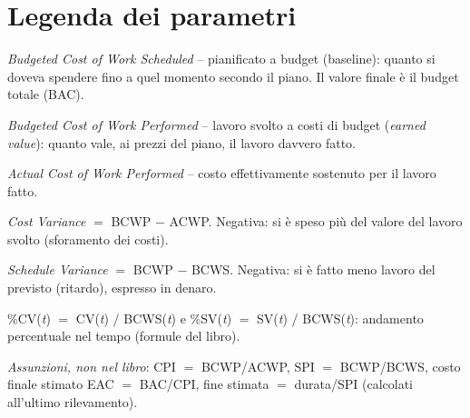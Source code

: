\documentclass[a4paper,10pt]{article}
\newcommand{\Durata}{12}
\begin{document}
\begin{center}
\end{center}
\CCprevisione{}{\CCmotivo}

\section*{\large Legenda dei parametri}
\begin{small}
\begin{description}\setlength{\itemsep}{1pt}
  \item[BCWS] \emph{Budgeted Cost of Work Scheduled} -- pianificato a budget (baseline): quanto si doveva spendere fino a quel momento secondo il piano. Il valore finale è il budget totale (BAC).
  \item[BCWP] \emph{Budgeted Cost of Work Performed} -- lavoro svolto a costi di budget (\emph{earned value}): quanto vale, ai prezzi del piano, il lavoro davvero fatto.
  \item[ACWP] \emph{Actual Cost of Work Performed} -- costo effettivamente sostenuto per il lavoro fatto.
  \item[CV] \emph{Cost Variance} $=$ BCWP $-$ ACWP. Negativa: si è speso più del valore del lavoro svolto (sforamento dei costi).
  \item[SV] \emph{Schedule Variance} $=$ BCWP $-$ BCWS. Negativa: si è fatto meno lavoro del previsto (ritardo), espresso in denaro.
  \item[\%CV, \%SV] \%CV(\textit{t}) $=$ CV(\textit{t}) / BCWS(\textit{t}) e \%SV(\textit{t}) $=$ SV(\textit{t}) / BCWS(\textit{t}): andamento percentuale nel tempo (formule del libro).
  \item[CPI, SPI, EAC] \emph{Assunzioni, non nel libro}: CPI $=$ BCWP/ACWP, SPI $=$ BCWP/BCWS, costo finale stimato EAC $=$ BAC/CPI, fine stimata $=$ durata/SPI (calcolati all'ultimo rilevamento).
\end{description}
\end{small}
\end{document}
